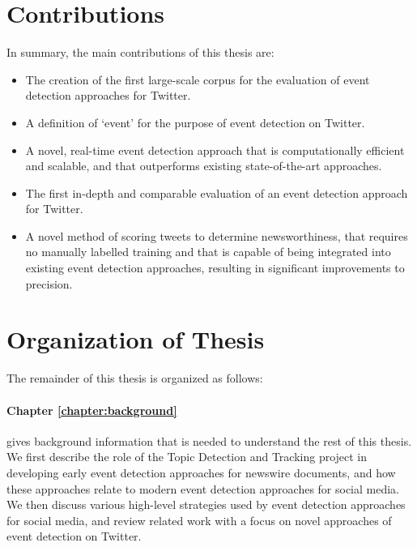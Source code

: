 \section{Contributions}
In summary, the main contributions of this thesis are:

\begin{itemize}
	\item The creation of the first large-scale corpus for the evaluation of event detection approaches for Twitter.

	\item A definition of `event' for the purpose of event detection on Twitter.

	\item A novel, real-time event detection approach that is computationally efficient and scalable, and that outperforms existing state-of-the-art approaches.

	\item The first in-depth and comparable evaluation of an event detection approach for Twitter.

	\item A novel method of scoring tweets to determine newsworthiness, that requires no manually labelled training and that is capable of being integrated into existing event detection approaches, resulting in significant improvements to precision.
\end{itemize}

\section{Organization of Thesis}

The remainder of this thesis is organized as follows:

\vspace{-0.5cm}
\paragraph{Chapter \ref{chapter:background}} gives background information that is needed to understand the rest of this thesis. We first describe the role of the Topic Detection and Tracking project in developing early event detection approaches for newswire documents, and how these approaches relate to modern event detection approaches for social media. We then discuss various high-level strategies used by event detection approaches for social media, and review related work with a focus on novel approaches of event detection on Twitter.

